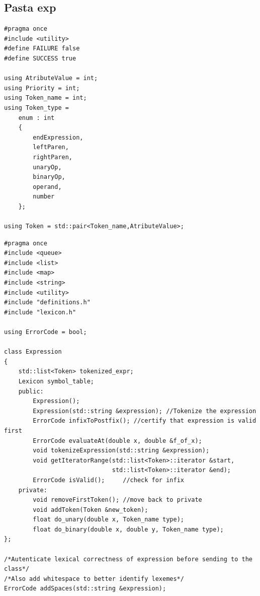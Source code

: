 \documentclass[14pt, letterpaper]{article}
\begin{document}
\newpage
\subsection{Pasta exp}

\begin{spacing}{2.5}
\end{spacing}

\begin{lstlisting}[caption=definition.h]
#pragma once
#include <utility>
#define FAILURE false
#define SUCCESS true

using AtributeValue = int;
using Priority = int;
using Token_name = int;
using Token_type = 
    enum : int
    {
        endExpression,
        leftParen,
        rightParen,
        unaryOp,
        binaryOp,
        operand,
        number
    };

using Token = std::pair<Token_name,AtributeValue>;
\end{lstlisting}

\begin{spacing}{3.5}
\end{spacing}

\begin{lstlisting}[caption=expression.h]
#pragma once
#include <queue>
#include <list>
#include <map>
#include <string>
#include <utility>
#include "definitions.h"
#include "lexicon.h"

using ErrorCode = bool;

class Expression
{
    std::list<Token> tokenized_expr;
    Lexicon symbol_table;
    public:
        Expression();
        Expression(std::string &expression); //Tokenize the expression
        ErrorCode infixToPostfix(); //certify that expression is valid first
        ErrorCode evaluateAt(double x, double &f_of_x);
        void tokenizeExpression(std::string &expression);
        void getIteratorRange(std::list<Token>::iterator &start,
                              std::list<Token>::iterator &end); 
        ErrorCode isValid();     //check for infix
    private:
        void removeFirstToken(); //move back to private
        void addToken(Token &new_token);
        float do_unary(double x, Token_name type);
        float do_binary(double x, double y, Token_name type);
};

/*Autenticate lexical correctness of expression before sending to the class*/
/*Also add whitespace to better identify lexemes*/
ErrorCode addSpaces(std::string &expression);

\end{lstlisting}
\end{document}
